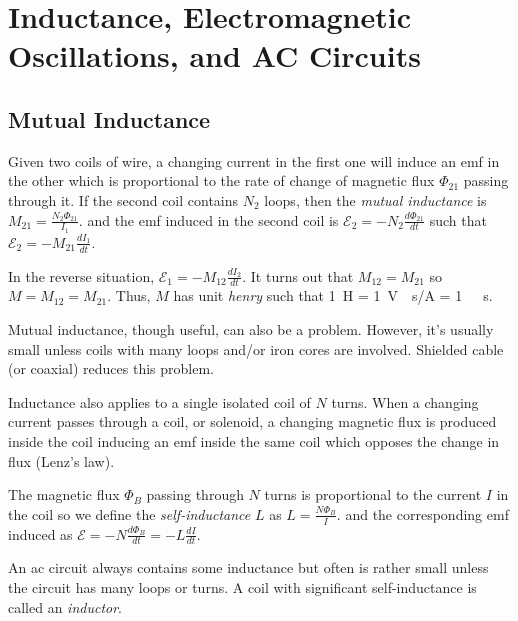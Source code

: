 \chapter{Inductance, Electromagnetic Oscillations, and AC Circuits}

\section{Mutual Inductance}

\begin{definition}
    Given two coils of wire, a changing current in the first one will induce an emf in the other which is proportional to the rate of change of magnetic flux $\Phi_{21}$ passing through it. If the second coil contains $N_2$ loops, then the \emph{mutual inductance} is $M_{21} = \frac{N_2\Phi_{21}}{I_1}$. and the emf induced in the second coil is $\mathscr{E}_2 = -N_2\frac{d\Phi_{21}}{dt}$ such that $\mathscr{E}_2 = -M_{21}\frac{dI_1}{dt}$.
\end{definition}
\begin{remark}
    In the reverse situation, $\mathscr{E}_1 = -M_{12}\frac{dI_2}{dt}$. It turns out that $M_{12} = M_{21}$ so $M = M_{12} = M_{21}$. Thus, $M$ has unit \emph{henry} such that \qty{1}{H} = \qty{1}{V\cdot s/A} = \qty{1}{\Omega\cdot s}.
\end{remark}
\begin{note}
    Mutual inductance, though useful, can also be a problem. However, it's usually small unless coils with many loops and/or iron cores are involved. Shielded cable (or coaxial) reduces this problem.
\end{note}
\begin{remark}
    Inductance also applies to a single isolated coil of $N$ turns. When a changing current passes through a coil, or solenoid, a changing magnetic flux is produced inside the coil inducing an emf inside the same coil which opposes the change in flux (Lenz's law). 
\end{remark}
\begin{definition}
    The magnetic flux $\Phi_B$ passing through $N$ turns is proportional to the current $I$ in the coil so we define the \emph{self-inductance} $L$ as $L = \frac{N\Phi_B}{I}$. and the corresponding emf induced as $\mathscr{E} = -N\frac{d\Phi_B}{dt} = -L\frac{dI}{dt}$.
\end{definition}
\begin{definition}[Inductor]
    An ac circuit always contains some inductance but often is rather small unless the circuit has many loops or turns. A coil with significant self-inductance is called an \emph{inductor}.
\end{definition}
